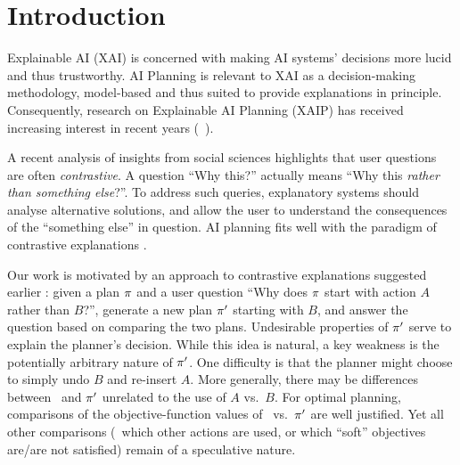 \section{Introduction}
\label{introduction}

%
Explainable AI (XAI) is concerned with making AI systems' decisions
more lucid and thus trustworthy. AI Planning is relevant to XAI as a
decision-making methodology, model-based and thus suited to provide
explanations in principle. Consequently, research on Explainable AI
Planning (XAIP) has received increasing interest in recent years
(\eg\ \cite{citekeyrelatedworks}).

A recent analysis \cite{miller:ai-19} of insights from social sciences
highlights that user questions are often \emph{contrastive}. A
question ``Why this?'' actually means ``Why this \emph{rather than
  something else}?''. To address such queries, explanatory systems
should analyse alternative solutions, and allow the user to understand
the consequences of the ``something else'' in question.
%
AI planning fits well with the paradigm of contrastive explanations
\cite{fox:etal:ijcai-ws-17,miller:corr-18}. 

Our work is motivated by an approach to contrastive explanations
suggested earlier \cite{fox:etal:ijcai-ws-17}: given a plan $\pi$
and a user question ``Why does $\pi$ start with action $A$ rather
than $B$?'', generate a new plan $\pi'$ starting with $B$, and
answer the question based on comparing the two plans. Undesirable
properties of $\pi'$ serve to explain the planner's decision. While
this idea is natural, a key weakness is the potentially arbitrary
nature of $\pi'$. One difficulty is that the planner might choose to
simply undo $B$ and re-insert $A$. More generally, there may be
differences between \plan\ and $\pi'$ unrelated to the use of $A$
vs.\ $B$. For optimal planning, comparisons of the objective-function
values of \plan\ vs.\ $\pi'$ are well justified. Yet all other
comparisons (\eg\ which other actions are used, or which ``soft''
objectives are/are not satisfied) remain of a speculative nature.

